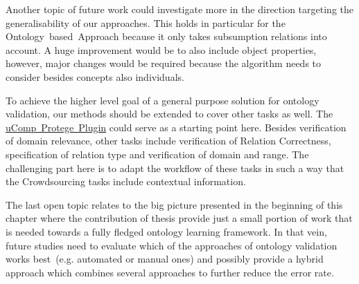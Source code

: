 Another topic of future work could investigate more in the direction targeting the generalisability of our approaches. This holds in particular for the Ontology~based~Approach because it only takes subsumption relations into account. A huge improvement would be to also include object properties, however, major changes would be required because the algorithm needs to consider besides concepts also individuals. 

To achieve the higher level goal of a general purpose solution for ontology validation, our methods should be extended to cover other tasks as well.
The \hyperref[sec:ucomp_protege_plugin]{uComp~Protege~Plugin} could serve as a starting point here. Besides verification of domain relevance, other tasks include verification of Relation Correctness, specification of relation type and verification of domain and range. The challenging part here is to adapt the workflow of these tasks in such a way that the Crowdsourcing tasks include contextual information. 

The last open topic relates to the big picture presented in the beginning of this chapter where the contribution of thesis provide just a small portion of work that is needed towards a fully fledged ontology learning framework. In that vein, future studies need to evaluate which of the approaches of ontology validation works best~(e.g. automated or manual ones) and possibly provide a hybrid approach which combines several approaches to further reduce the error rate. 



